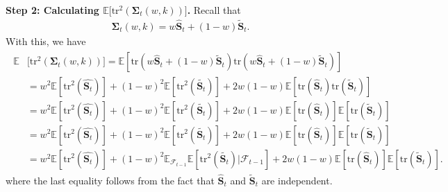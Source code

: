 \noindent
\textbf{Step 2: Calculating $\mathbb{E}\bigl[\mathrm{tr}^2(\bm{\Sigma}_t(w,k))\bigr]$.} Recall that
\begin{align}
\bm{\Sigma}_t(w,k) = w\widehat{\bm S}_t+(1-w)\widetilde{\bm S}_t.
\end{align}
With this, we have
\begin{align}
\begin{split}
\label{tr^2_first_calculation}
\mathbb{E}&\bigl[\mathrm{tr}^2(\bm{\Sigma}_t(w,k))\bigr]=\mathbb{E}[\mathrm{tr}(w\widehat{\bm S}_t+(1-w)\widetilde{\bm S}_t)\mathrm{tr}(w\widehat{\bm S}_t+(1-w)\widetilde{\bm S}_t)]  \\&=w^2\mathbb{E}[\mathrm{tr}^2(\widehat{\bm{S}_t})]+(1-w)^2\mathbb{E}[\mathrm{tr}^2(\widetilde{\bm{S}_t})]+2w(1-w)\mathbb{E}[\mathrm{tr}(\widehat{\bm S}_t)\mathrm{tr}(\widetilde{\bm S}_t)] \\ &=w^2\mathbb{E}[\mathrm{tr}^2(\widehat{\bm{S}_t})]+(1-w)^2\mathbb{E}[\mathrm{tr}^2(\widetilde{\bm{S}_t})]+2w(1-w)\mathbb{E}[\mathrm{tr}(\widehat{\bm S}_t)]\mathbb{E}[\mathrm{tr}(\widetilde{\bm{S}}_t)] \\&=w^2\mathbb{E}[\mathrm{tr}^2(\widehat{\bm{S}_t})]+(1-w)^2\mathbb{E}[\mathrm{tr}^2(\widetilde{\bm{S}_t})]+2w(1-w)\mathbb{E}[\mathrm{tr}(\widehat{\bm S}_t)]\mathbb{E}[\mathrm{tr}(\widetilde{\bm S}_t)]  \\ &= w^2\mathbb{E}[\mathrm{tr}^2(\widehat{\bm{S}_t})]+(1-w)^2\mathbb{E}_{\mathcal{F}_{t-1}}\mathbb{E}[\mathrm{tr}^2(\widetilde{\bm{S}_t})|\mathcal{F}_{t-1}]+2w(1-w)\mathbb{E}[\mathrm{tr}(\widehat{\bm S}_t)]\mathbb{E}[\mathrm{tr}(\widetilde{\bm S}_t)]. 
\end{split}
\end{align}
where the last equality follows from the fact that ${\widehat{\bm S}_t}$ and $\widetilde{\bm{S}}_t$ are independent. 

